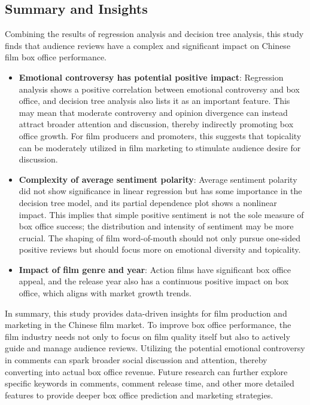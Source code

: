 \documentclass{article}
\begin{document}
\subsection{Summary and Insights}
Combining the results of regression analysis and decision tree analysis, this study finds that audience reviews have a complex and significant impact on Chinese film box office performance.
\begin{itemize}
\item \textbf{Emotional controversy has potential positive impact}: Regression analysis shows a positive correlation between emotional controversy and box office, and decision tree analysis also lists it as an important feature. This may mean that moderate controversy and opinion divergence can instead attract broader attention and discussion, thereby indirectly promoting box office growth. For film producers and promoters, this suggests that topicality can be moderately utilized in film marketing to stimulate audience desire for discussion.
\item \textbf{Complexity of average sentiment polarity}: Average sentiment polarity did not show significance in linear regression but has some importance in the decision tree model, and its partial dependence plot shows a nonlinear impact. This implies that simple positive sentiment is not the sole measure of box office success; the distribution and intensity of sentiment may be more crucial. The shaping of film word-of-mouth should not only pursue one-sided positive reviews but should focus more on emotional diversity and topicality.
\item \textbf{Impact of film genre and year}: Action films have significant box office appeal, and the release year also has a continuous positive impact on box office, which aligns with market growth trends.
\end{itemize}
In summary, this study provides data-driven insights for film production and marketing in the Chinese film market. To improve box office performance, the film industry needs not only to focus on film quality itself but also to actively guide and manage audience reviews. Utilizing the potential emotional controversy in comments can spark broader social discussion and attention, thereby converting into actual box office revenue. Future research can further explore specific keywords in comments, comment release time, and other more detailed features to provide deeper box office prediction and marketing strategies.

\printbibliography[title={References}]
\end{document}
